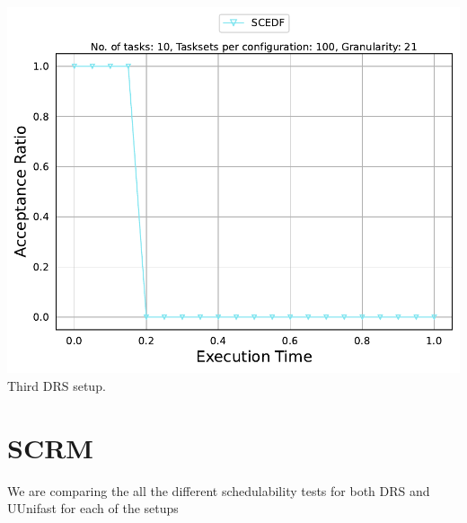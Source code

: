 \documentclass[]{article}
\begin{document}
\begin{minipage}[t]{0.48\linewidth}
            \includegraphics[width=\linewidth]{SCEDF_3rd Setup.pdf}
		Third DRS setup.
		\vspace{0.3cm}


                   

	\end{minipage}

        \clearpage

        \section{SCRM}
{
\raggedleft We are comparing the all the different schedulability tests for both DRS and UUnifast for each of the setups \newline
}
\end{document}
